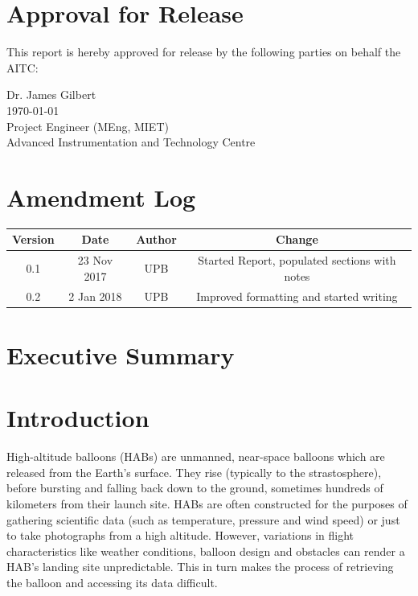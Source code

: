 \documentclass[11pt]{article}
\begin{document}
\newpage

\bigskip
\section{Approval for Release}
This report is hereby approved for release by the following parties on behalf the AITC: \\

\bigskip
\bigskip

\begin{center}
Dr. James Gilbert \\
\today \\
Project Engineer (MEng, MIET) \\
Advanced Instrumentation and Technology Centre
\end{center}


\newpage
\section{Amendment Log}

\begin{table}[!h] \centering
 \begin{tabular}{|c c c c|} 
 \hline
 Version & Date & Author & Change \\ [0.5ex] 
 \hline
 0.1 & 23 Nov 2017 & UPB & Started Report, populated sections with notes \\
 \hline
  0.2 & 2 Jan 2018 & UPB & Improved formatting and started writing \\
 \hline
\end{tabular}
\end{table}

\newpage

\section{Executive Summary}

\newpage

\tableofcontents

\listoffigures

\listoftables

\newpage

\section{Introduction}

High-altitude balloons (HABs) are unmanned, near-space balloons which are released from the Earth's surface. They rise (typically to the strastosphere), before bursting and falling back down to the ground, sometimes hundreds of kilometers from their launch site. HABs are often constructed for the purposes of gathering scientific data (such as temperature, pressure and wind speed) or just to take photographs from a high altitude. However, variations in flight characteristics like weather conditions, balloon design and obstacles can render a HAB's landing site unpredictable. This in turn makes the process of retrieving the balloon and accessing its data difficult. \\
\end{document}
